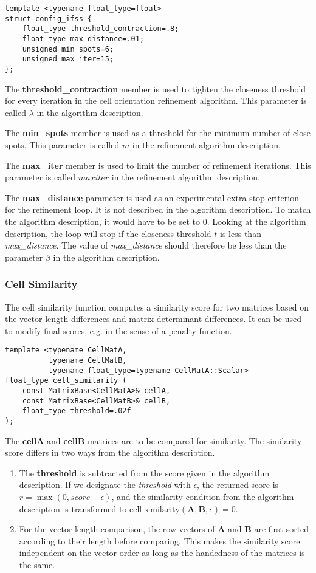 \documentclass[a4paper,10pt]{article}
\newcommand{\mat}[1]{\mathbf{#1}}
\begin{document}
\begin{lstlisting}
template <typename float_type=float>
struct config_ifss {
    float_type threshold_contraction=.8;
    float_type max_distance=.01;
    unsigned min_spots=6;
    unsigned max_iter=15;
};
\end{lstlisting}

The \textbf{threshold\_contraction} member is used to tighten the closeness threshold for every iteration in the cell orientation refinement algorithm. This parameter is called $\lambda$ in the algorithm description.

The \textbf{min\_spots} member is used as a threshold for the minimum number of close spots. This parameter is called $m$ in the refinement algorithm description.

The \textbf{max\_iter} member is used to limit the number of refinement iterations. This parameter is called $maxiter$ in the refinement algorithm description.

The \textbf{max\_distance} parameter is used as an experimental extra stop criterion for the refinement loop. It is not described in the algorithm description. To match the algorithm description, it would have to be set to $0$. Looking at the algorithm description, the loop will stop if the closeness threshold $t$ is less than \emph{max\_distance}. The value of \emph{max\_distance} should therefore be less than the parameter $\beta$ in the algorithm description.

\subsubsection{Cell Similarity}

The cell similarity function computes a similarity score for two matrices based on the vector length differences and matrix determinant differences. It can be used to modify final scores, e.g. in the sense of a penalty function.
%
\begin{lstlisting}
template <typename CellMatA,
          typename CellMatB,
          typename float_type=typename CellMatA::Scalar>
float_type cell_similarity (
    const MatrixBase<CellMatA>& cellA,
    const MatrixBase<CellMatB>& cellB,
    float_type threshold=.02f
);
\end{lstlisting}
%
The \textbf{cellA} and \textbf{cellB} matrices are to be compared for similarity. The similarity score differs in two ways from the algorithm describtion.
%
\begin{enumerate}
 \item The \textbf{threshold} is subtracted from the score given in the algorithm description. If we designate the \emph{threshold} with $\epsilon$, the returned score is $r = \max(0, score - \epsilon)$, and the similarity condition from the algorithm description is transformed to $\text{cell\_similarity}(\mat{A},\mat{B},\epsilon) = 0$.
 \item For the vector length comparison, the row vectors of $\mat{A}$ and $\mat{B}$ are first sorted according to their length before comparing. This makes the similarity score independent on the vector order as long as the handedness of the matrices is the same.
\end{enumerate}
\end{document}
